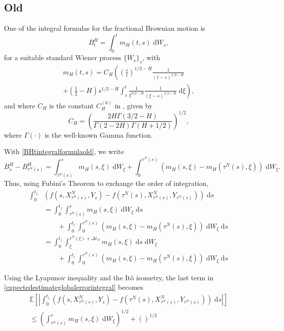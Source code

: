 \documentclass[reqno,12pt]{amsart}
\theoremstyle{plain}%
\theoremstyle{definition}
\begin{document}
\subsection{Old}
One of the integral formulas for the fractional Brownian motion is \cite[Section 1.8]{Mishura2008}
\begin{equation}
    \label{BHtintegralformulaold}
    B^H_t = \int_0^t m_H(t, s) \;\mathrm{d}W_s,
\end{equation}
for a suitable standard Wiener process $\{W_s\}_s$, with
\begin{multline}
    \label{mH}
    m_H(t, s) = C_H \left( \left(\frac{s}{t}\right)^{1/2 - H} \frac{1}{(t - s)^{1/2 - H}} \right. \\
    \left. + \left(\frac{1}{2} - H\right) s^{1/2 - H}\int_s^t\frac{1}{\xi^{3/2 - H}}\frac{1}{(\xi - s)^{1/2 - H}}\;\mathrm{d}\xi\right),
\end{multline}
and where $C_H$ is the constant $C_H^{(6)}$ in \cite[Section 1.8]{Mishura2008}, given by
\begin{equation}
    \label{defCH}
    C_H = \left( \frac{2H\Gamma(3/2 - H)}{\Gamma(2 - 2H)\Gamma(H + 1/2)} \right)^{1/2},
\end{equation}
where $\Gamma(\cdot)$ is the well-known Gamma function.

With \eqref{BHtintegralformulaold}, we write
\[
    B^H_s - B^H_{\tau^N(s)} = \int_{\tau^N(s)}^s m_H(s, \xi) \;\mathrm{d}W_\xi + \int_0^{\tau^N(s)} \left(m_H(s, \xi) - m_H(\tau^N(s), \xi) \right) \;\mathrm{d}W_\xi. 
\]
Thus, using Fubini's Theorem to exchange the order of integration,
\begin{align*}
    \int_0^{t_j} & \left( f(s, X_{\tau^N(s)}^N, Y_s) - f(\tau^N(s), X_{\tau^N(s)}^N, Y_{\tau^N(s)}) \right)\;\mathrm{d}s \\
    & = \int_0^{t_j} \int_{\tau^N(s)}^s m_H(s, \xi) \;\mathrm{d}W_\xi \;\mathrm{d}s \\
    & \qquad + \int_0^{t_j} \int_0^{\tau^N(s)} \left(m_H(s, \xi) - m_H(\tau^N(s), \xi) \right) \;\mathrm{d}W_\xi \;\mathrm{d}s \\
    & = \int_0^{t_j} \int_{\xi}^{\tau^N(\xi) + \Delta t_N} m_H(s, \xi) \;\mathrm{d}s \;\mathrm{d}W_\xi  \\
    & \qquad + \int_0^{t_j} \int_0^{\tau^N(s)} \left(m_H(s, \xi) - m_H(\tau^N(s), \xi) \right) \;\mathrm{d}W_\xi \;\mathrm{d}s
\end{align*}

Using the Lyapunov inequality and the It\^o isometry, the last term in \eqref{expectedestimateglobalerrorintegral} becomes
\begin{multline*}
    \mathbb{E}\left[\left|\int_0^{t_j} \left( f(s, X_{\tau^N(s)}^N, Y_s) - f(\tau^N(s), X_{\tau^N(s)}^N, Y_{\tau^N(s)}) \right)\;\mathrm{d}s\right|\right] \\
    \leq \left( \int_{\tau^N(s)}^s m_H(s, \xi) \;\mathrm{d}W_\xi\right)^{1/2} + \left( \right)^{1/2}
\end{multline*}
\end{document}
